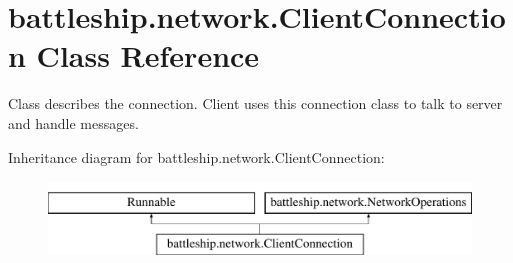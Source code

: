 \hypertarget{classbattleship_1_1network_1_1ClientConnection}{}\section{battleship.\+network.\+Client\+Connection Class Reference}
\label{classbattleship_1_1network_1_1ClientConnection}


Class describes the connection. Client uses this connection class to talk to server and handle messages.  


Inheritance diagram for battleship.\+network.\+Client\+Connection\+:\begin{figure}[H]
\begin{center}
\leavevmode
\includegraphics[height=2.000000cm]{classbattleship_1_1network_1_1ClientConnection}
\end{center}
\end{figure}
